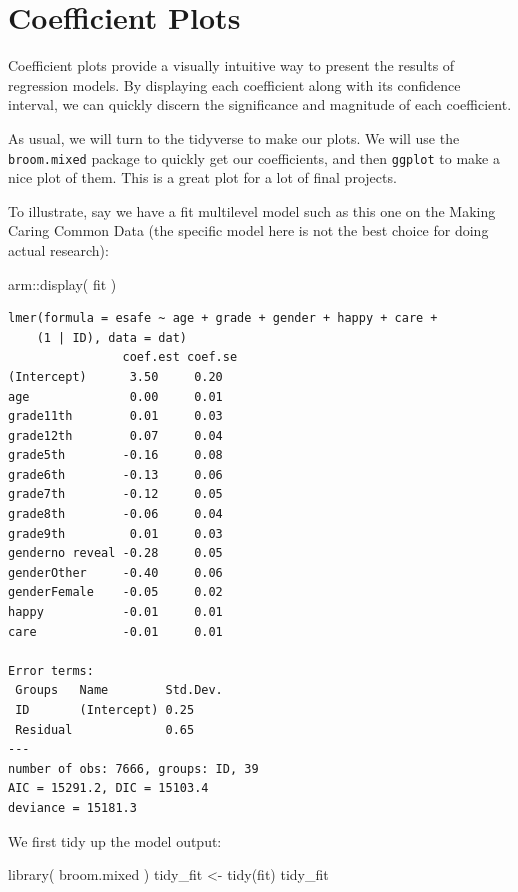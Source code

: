 \documentclass[
  letterpaper,
  DIV=11,
  numbers=noendperiod]{scrreprt}
\newenvironment{Shaded}{}{}
\newcommand{\FunctionTok}[1]{\textcolor[rgb]{0.02,0.16,0.49}{#1}}
\newcommand{\NormalTok}[1]{#1}
\newcommand{\OtherTok}[1]{\textcolor[rgb]{0.00,0.44,0.13}{#1}}
\newcommand{\SpecialCharTok}[1]{\textcolor[rgb]{0.25,0.44,0.63}{#1}}
\begin{document}
\chapter{Coefficient Plots}\label{coefficient-plots}

Coefficient plots provide a visually intuitive way to present the
results of regression models. By displaying each coefficient along with
its confidence interval, we can quickly discern the significance and
magnitude of each coefficient.

As usual, we will turn to the tidyverse to make our plots. We will use
the \texttt{broom.mixed} package to quickly get our coefficients, and
then \texttt{ggplot} to make a nice plot of them. This is a great plot
for a lot of final projects.

To illustrate, say we have a fit multilevel model such as this one on
the Making Caring Common Data (the specific model here is not the best
choice for doing actual research):

\begin{Shaded}
\begin{Highlighting}[]
\NormalTok{arm}\SpecialCharTok{::}\FunctionTok{display}\NormalTok{( fit )}
\end{Highlighting}
\end{Shaded}

\begin{verbatim}
lmer(formula = esafe ~ age + grade + gender + happy + care + 
    (1 | ID), data = dat)
                coef.est coef.se
(Intercept)      3.50     0.20  
age              0.00     0.01  
grade11th        0.01     0.03  
grade12th        0.07     0.04  
grade5th        -0.16     0.08  
grade6th        -0.13     0.06  
grade7th        -0.12     0.05  
grade8th        -0.06     0.04  
grade9th         0.01     0.03  
genderno reveal -0.28     0.05  
genderOther     -0.40     0.06  
genderFemale    -0.05     0.02  
happy           -0.01     0.01  
care            -0.01     0.01  

Error terms:
 Groups   Name        Std.Dev.
 ID       (Intercept) 0.25    
 Residual             0.65    
---
number of obs: 7666, groups: ID, 39
AIC = 15291.2, DIC = 15103.4
deviance = 15181.3 
\end{verbatim}

We first tidy up the model output:

\begin{Shaded}
\begin{Highlighting}[]
\FunctionTok{library}\NormalTok{( broom.mixed )}
\NormalTok{tidy\_fit }\OtherTok{\textless{}{-}} \FunctionTok{tidy}\NormalTok{(fit)}
\NormalTok{tidy\_fit}
\end{Highlighting}
\end{Shaded}
\end{document}
